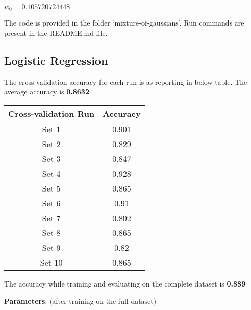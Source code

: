 \documentclass[a4paper]{article}
\begin{document}
\vspace{3mm}
$w_0 = 0.105720724448$

\vspace{3mm}

The code is provided in the folder `mixture-of-gaussians'. Run commands are present in the README.md file.

\newpage

\subsection{Logistic Regression} \label{logistic_regression_section}
The cross-validation accuracy for each run is as reporting in below table. The average accuracy is \textbf{0.8632}

\begin{center} 
	\begin{tabular}{ |c|c| } 
		\hline
		\textbf{Cross-validation Run} & \textbf{Accuracy} \\
		\hline
		\hline
		Set 1 & 0.901 \\
		\hline
		Set 2 & 0.829 \\
		\hline
		Set 3 & 0.847 \\
		\hline
		Set 4 & 0.928 \\
		\hline
		Set 5 & 0.865 \\
		\hline
		Set 6 & 0.91 \\
		\hline
		Set 7 & 0.802 \\
		\hline
		Set 8 & 0.865 \\
		\hline
		Set 9 & 0.82 \\
		\hline
		Set 10 & 0.865 \\
		\hline
	\end{tabular}
\end{center}

The accuracy while training and evaluating on the complete dataset is \textbf{0.889}

\vspace{3mm}

\textbf{Parameters}: (after training on the full dataset)

\vspace{3mm}
\end{document}

